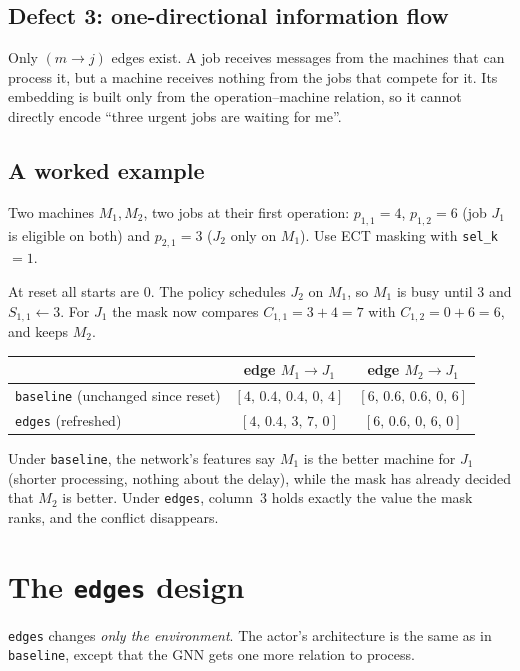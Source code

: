 \documentclass[11pt,a4paper]{article}
\newcommand{\code}[1]{\texttt{#1}}
\theoremstyle{remark}
\begin{document}
\subsection{Defect 3: one-directional information flow}
Only $(m\to j)$ edges exist. A job receives messages from the machines that can process it,
but a machine receives nothing from the jobs that compete for it. Its embedding is built
only from the operation--machine relation, so it cannot directly encode ``three urgent jobs
are waiting for me''.

\subsection{A worked example}
\label{sec:example}
Two machines $M_1,M_2$, two jobs at their first operation:
$p_{1,1}=4$, $p_{1,2}=6$ (job $J_1$ is eligible on both) and $p_{2,1}=3$ ($J_2$ only on $M_1$).
Use ECT masking with \code{sel\_k}$=1$.

At reset all starts are $0$. The policy schedules $J_2$ on $M_1$, so $M_1$ is busy until $3$ and
$S_{1,1}\leftarrow 3$. For $J_1$ the mask now compares $C_{1,1}=3+4=7$ with $C_{1,2}=0+6=6$,
and keeps $M_2$.

\begin{center}
\begin{tabular}{l c c}
\toprule
 & edge $M_1\to J_1$ & edge $M_2\to J_1$ \\
\midrule
\code{baseline} (unchanged since reset) & $[4,\,0.4,\,0.4,\,0,\,4]$ & $[6,\,0.6,\,0.6,\,0,\,6]$ \\
\code{edges} (refreshed)               & $[4,\,0.4,\,3,\,7,\,0]$   & $[6,\,0.6,\,0,\,6,\,0]$ \\
\bottomrule
\end{tabular}
\end{center}

Under \code{baseline}, the network's features say $M_1$ is the better machine for $J_1$
(shorter processing, nothing about the delay), while the mask has already decided that
$M_2$ is better. Under \code{edges}, column~3 holds exactly the value the mask ranks, and
the conflict disappears.

\section{The \texttt{edges} design}
\label{sec:edges}

\code{edges} changes \emph{only the environment}. The actor's architecture is the
same as in \code{baseline}, except that the GNN gets one more relation to process.
\end{document}
